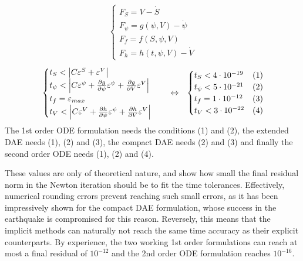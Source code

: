 \begin{align}
	\begin{cases}
		F_S = V - \dot{S} \\ F_\psi = g(\psi,V) - \dot{\psi} \\ F_f = f(S,\psi,V) \\ F_h = h(t,\psi,V) - \dot{V}
	\end{cases}
\end{align}
\begin{align}
	&\begin{cases}
	t_S < \left|C\varepsilon^S + \varepsilon^V\right| \\
	t_\psi < \left|C\varepsilon^\psi + \pdv{g}{\psi}\varepsilon^\psi + \pdv{g}{V}\varepsilon^V\right| \\
	t_f = \varepsilon_{max} \\
	t_V < \left|C\varepsilon^V + \pdv{h}{\psi}\varepsilon^\psi + \pdv{h}{V}\varepsilon^V\right|
	\end{cases} &&\Leftrightarrow&
	\begin{cases}
	t_S < 4\cdot10^{-19} & (1)\\ 
	t_\psi < 5\cdot10^{-21} & (2)\\
	t_f = 1\cdot10^{-12} & (3) \\
	t_V < 3\cdot10^{-22} & (4)
	\end{cases}
\end{align}
The 1st order ODE formulation needs the conditions (1) and (2), the extended DAE needs (1), (2) and (3), the compact DAE needs (2) and (3) and finally the second order ODE needs (1), (2) and (4). 

These values are only of theoretical nature, and show how small the final residual norm in the Newton iteration should be to fit the time tolerances. Effectively, numerical rounding errors prevent reaching such small errors, as it has been impressively shown for the compact DAE formulation, whose success  in the earthquake is compromised for this reason. Reversely, this means that the implicit methods can naturally not reach the same time accuracy as their explicit counterparts. By experience, the two working 1st order formulations can reach at most a final residual of $10^{-12}$ and the 2nd order ODE formulation reaches $10^{-16}$.


